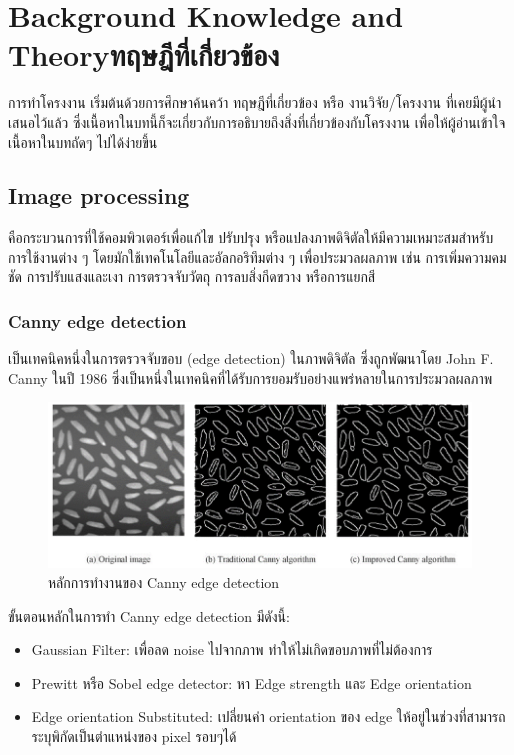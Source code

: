 \chapter{\ifenglish Background Knowledge and Theory\else ทฤษฎีที่เกี่ยวข้อง\fi}

การทำโครงงาน เริ่มต้นด้วยการศึกษาค้นคว้า ทฤษฎีที่เกี่ยวข้อง หรือ งานวิจัย/โครงงาน ที่เคยมีผู้นำเสนอไว้แล้ว ซึ่งเนื้อหาในบทนี้ก็จะเกี่ยวกับการอธิบายถึงสิ่งที่เกี่ยวข้องกับโครงงาน เพื่อให้ผู้อ่านเข้าใจเนื้อหาในบทถัดๆ ไปได้ง่ายขึ้น

\section{Image processing}

คือกระบวนการที่ใช้คอมพิวเตอร์เพื่อแก้ไข ปรับปรุง หรือแปลงภาพดิจิตัลให้มีความเหมาะสมสำหรับการใช้งานต่าง ๆ โดยมักใช้เทคโนโลยีและอัลกอริทึมต่าง ๆ เพื่อประมวลผลภาพ เช่น การเพิ่มความคมชัด การปรับแสงและเงา การตรวจจับวัตถุ การลบสิ่งกีดขวาง หรือการแยกสี

\subsection{Canny edge detection}

เป็นเทคนิคหนึ่งในการตรวจจับขอบ (edge detection) ในภาพดิจิตัล ซึ่งถูกพัฒนาโดย John F. Canny ในปี 1986 ซึ่งเป็นหนึ่งในเทคนิคที่ได้รับการยอมรับอย่างแพร่หลายในการประมวลผลภาพ

\begin{figure}[h!]
  \begin{center}
    \includegraphics{2_1.png}
  \end{center}
  \caption[Poem]{หลักการทำงานของ Canny edge detection}
\end{figure}

ขั้นตอนหลักในการทำ Canny edge detection มีดังนี้:

\begin{itemize}
  \item {Gaussian Filter: เพื่อลด noise ไปจากภาพ ทำให้ไม่เกิดขอบภาพที่ไม่ต้องการ}
  \item {Prewitt หรือ Sobel edge detector: หา Edge strength และ Edge orientation}
  \item {Edge orientation Substituted: เปลี่ยนค่า orientation ของ edge ให้อยู่ในช่วงที่สามารถระบุพิกัดเป็นตำแหน่งของ pixel รอบๆได้}
\end{itemize}

